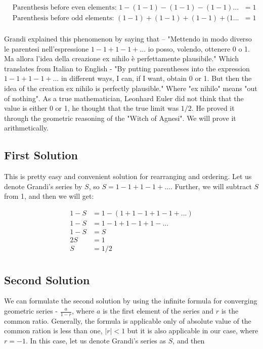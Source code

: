 \documentclass[a4paper]{article}
\begin{document}
\begin{align*}
&\text{Parenthesis before even elements: } 1-(1-1)-(1-1)-(1-1)...&=1\\
&\text{Parenthesis before odd elements: } (1-1)+(1-1)+(1-1)+(1...&=1\\
\end{align*}

Grandi explained this phenomenon by saying that – "Mettendo in modo diverso le parentesi
nell'espressione $1-1+1-1+...$ io posso, volendo, ottenere 0 o 1. Ma allora l'idea della creazione ex
nihilo è perfettamente plausibile."\cite{Mettendo} Which translates from Italian to English - "By putting parentheses into the expression
$1-1+1-1+...$ in different ways, I can, if I want, obtain 0 or 1. But then the idea of the creation
ex nihilo is perfectly plausible." Where "ex nihilo" means "out of nothing".\cite{Exnihilo}
As a true mathematician, Leonhard Euler did not think that the value is either 0 or 1, he thought that the true limit was $1/2$.
He proved it through the geometric reasoning of the "Witch of Agnesi". We will prove it arithmetically.

\subsection{First Solution}

This is pretty easy and convenient solution for rearranging and ordering. Let us denote Grandi’s
series by $S$, so $S=1-1+1-1+...$. Further, we will subtract $S$ from 1, and then we will get:

\begin{align*}
  1-S&=1-(1+1-1+1-1+...)\\
  1-S&=1-1+1-1+1-...\\
  1-S&=S\\
  2S&=1\\
  S&=1/2\\
  \end{align*}

\subsection{Second Solution}

We can formulate the second solution by using the infinite formula for converging geometric
series - $\frac{a}{1-r}$, where $a$ is the first element of the series and $r$ is the common ratio.
Generally, the formula is applicable only of absolute value of the common ration is less than one, $|r| < 1$ but
it is also applicable in our case, where $r = - 1$. In this case, let us denote Grandi's series as $S$, and
then
\end{document}
